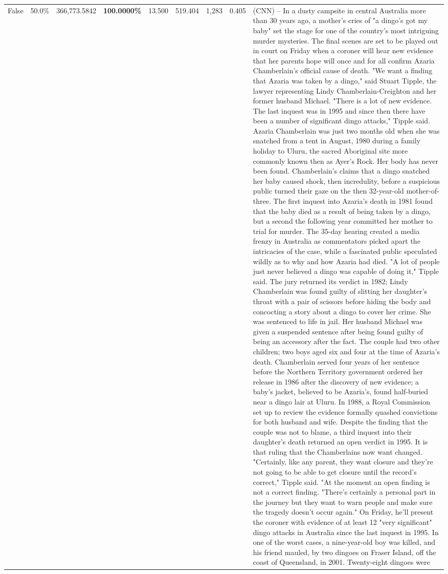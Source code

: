 \begin{table}[H]
\begin{tabular}{lllrlllll}
False & 50.0\% & 366,773.5842 & \bfseries \color{red} 100.0000\% & 13.500 & 519.404 & 1,283 & 0.405 & (CNN) -- In a dusty campsite in central Australia more than 30 years ago, a mother's cries of "a dingo's got my baby" set the stage for one of the country's most intriguing murder mysteries. The final scenes are set to be played out in court on Friday when a coroner will hear new evidence that her parents hope will once and for all confirm Azaria Chamberlain's official cause of death. "We want a finding that Azaria was taken by a dingo," said Stuart Tipple, the lawyer representing Lindy Chamberlain-Creighton and her former husband Michael. "There is a lot of new evidence. The last inquest was in 1995 and since then there have been a number of significant dingo attacks," Tipple said. Azaria Chamberlain was just two months old when she was snatched from a tent in August, 1980 during a family holiday to Uluru, the sacred Aboriginal site more commonly known then as Ayer's Rock. Her body has never been found. Chamberlain's claims that a dingo snatched her baby caused shock, then incredulity, before a suspicious public turned their gaze on the then 32-year-old mother-of-three. The first inquest into Azaria's death in 1981 found that the baby died as a result of being taken by a dingo, but a second the following year committed her mother to trial for murder. The 35-day hearing created a media frenzy in Australia as commentators picked apart the intricacies of the case, while a fascinated public speculated wildly as to why and how Azaria had died. "A lot of people just never believed a dingo was capable of doing it," Tipple said. The jury returned its verdict in 1982; Lindy Chamberlain was found guilty of slitting her daughter's throat with a pair of scissors before hiding the body and concocting a story about a dingo to cover her crime. She was sentenced to life in jail. Her husband Michael was given a suspended sentence after being found guilty of being an accessory after the fact. The couple had two other children; two boys aged six and four at the time of Azaria's death. Chamberlain served four years of her sentence before the Northern Territory government ordered her release in 1986 after the discovery of new evidence; a baby's jacket, believed to be Azaria's, found half-buried near a dingo lair at Uluru. In 1988, a Royal Commission set up to review the evidence formally quashed convictions for both husband and wife. Despite the finding that the couple was not to blame, a third inquest into their daughter's death returned an open verdict in 1995. It is that ruling that the Chamberlains now want changed. "Certainly, like any parent, they want closure and they're not going to be able to get closure until the record's correct," Tipple said. "At the moment an open finding is not a correct finding. "There's certainly a personal part in the journey but they want to warn people and make sure the tragedy doesn't occur again." On Friday, he'll present the coroner with evidence of at least 12 "very significant" dingo attacks in Australia since the last inquest in 1995. In one of the worst cases, a nine-year-old boy was killed, and his friend mauled, by two dingoes on Fraser Island, off the coast of Queensland, in 2001. Twenty-eight dingoes were 
\end{tabular}
\end{table}
